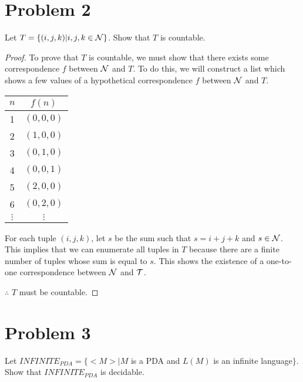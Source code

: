 \documentclass[11pt]{article}
\begin{document}
\newpage
\section*{Problem 2}

Let $T=\{(i,j,k)|i,j,k\in{\cal N}\}$. Show that $T$ is countable.

\begin{proof}
To prove that $T$ is countable, we must show that there exists some correspondence $f$ between $\cal N$ and $T$. To do this, we will construct a list which shows a few values of a hypothetical correspondence $f$ between $\cal N$ and $T$.

\begin{center}
\begin{tabular}{ c | c }
 $n$ & $f(n)$ \\
 \hline 
 1 & $(0,0,0)$ \\
 2 & $(1,0,0)$ \\
 3 & $(0,1,0)$ \\
 4 & $(0,0,1)$ \\
 5 & $(2,0,0)$ \\
 6 & $(0,2,0)$ \\
 $\vdots$ & $\vdots$
\end{tabular}
\end{center}

\noindent
For each tuple $(i,j,k)$, let $s$ be the sum such that $s = i+j+k$ and $s \in \cal N$. This implies that we can enumerate all tuples in $T$ because there are a finite number of tuples whose sum is equal to $s$. This shows the existence of a one-to-one correspondence between $\cal N$ and $\cal T$.

\noindent
$\therefore$ $T$ must be countable.
\end{proof}

\newpage
\section*{Problem 3}

Let $INFINITE_{PDA}=\{<M>|M$ is a PDA and $L(M)$ is an infinite language$\}$.
Show that $INFINITE_{PDA}$ is decidable.
\end{document}
